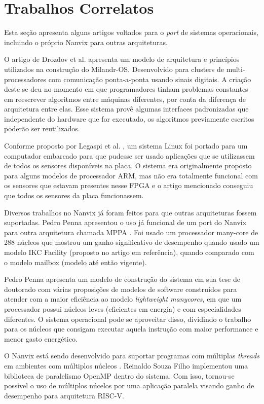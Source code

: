 \section{Trabalhos Correlatos}

Esta seção apresenta alguns artigos voltados para o \textit{port} de sistemas operacionais, incluindo o próprio Nanvix para outras arquiteturas.

O artigo de Drozdov et al. \cite{Drozdov2015RealTimeOS} apresenta um modelo de arquitetura e princípios utilizados na construção
do Milandr-OS. Desenvolvido para clusters de multi-processadores com comunicação ponta-a-ponta usando sinais digitais. A criação deste se deu no momento em que programadores tinham problemas constantes em reescrever algoritmos entre máquinas diferentes, por conta da diferença de arquitetura entre elas. Esse sistema provê algumas interfaces padronizadas que independente do hardware que for executado, os algoritmos previamente escritos poderão ser reutilizados.

Conforme proposto por Legaspi et al. \cite{7372829}, um sistema Linux foi portado para um computador embarcado para
que pudesse ser usado aplicações que se utilizassem de todos os sensores disponíveis na placa. O sistema era originalmente proposto para alguns modelos de processador ARM, mas não era totalmente funcional com os sensores que estavam presentes nesse FPGA e o artigo mencionado conseguiu que todos os sensores da placa funcionassem.

Diversos trabalhos no Nanvix já foram feitos para que outras arquiteturas fossem suportadas. Pedro Penna apresentou o uso já funcional de um port do Nanvix para outra arquitetura chamada MPPA \cite{PENNA20211}. Foi usado um processador many-core de 288 núcleos que mostrou um ganho significativo de desempenho quando usado um modelo IKC Facility (proposto no artigo em referência), quando comparado com o modelo mailbox (modelo até então vigente).

Pedro Penna apresenta um modelo de construção do sistema em sua tese de doutorado \cite{penna:tel-03545212} com várias proposições de modelos de software construídos para atender com a maior eficiência ao modelo \emph{lightweight manycores}, em que um processador possui núcleos leves (eficientes em energia) e com especialidades diferentes. O sistema operacional pode se aproveitar disso, dividindo o trabalho para os núcleos que consigam executar aquela instrução com maior performance e menor gasto energético.

O Nanvix está sendo desenvolvido para suportar programas com múltiplas \emph{threads} em ambientes com múltiplos núcleos \cite{MSC-Reinaldo}. Reinaldo Souza Filho implementou uma biblioteca de paralelismo OpenMP dentro do sistema. Com isso, tornou-se possível o uso de múltiplos núcelos por uma aplicação paralela visando ganho de desempenho para arquitetura RISC-V.

